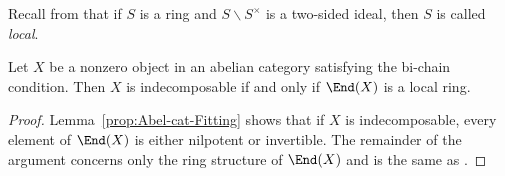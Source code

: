 Recall from \cite[Definition 6.12.3]{Li1} that if $S$ is a ring and
$S\smallsetminus S^\times$ is a two-sided ideal, then $S$ is called
\emph{local}.

\begin{corollary}\label{prop:indecomposable-local-ring}
	Let $X$ be a nonzero object in an abelian category satisfying the bi-chain
	condition. Then $X$ is indecomposable if and only if $\End(X)$ is a local
	ring.
\end{corollary}
\begin{proof}
	Lemma~\ref{prop:Abel-cat-Fitting} shows that if $X$ is indecomposable, every
	element of $\End(X)$ is either nilpotent or invertible. The remainder of
	the argument concerns only the ring structure of $\End(X)$ and is the same
	as \cite[Lemma 6.12.6]{Li1}.
\end{proof}

